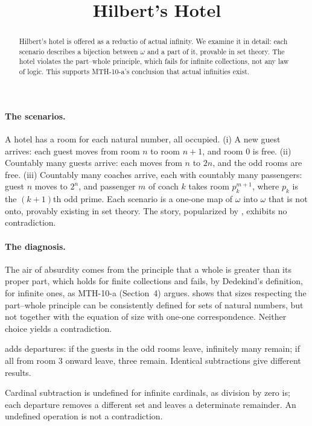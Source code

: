 \documentclass{situationist-preprint}
\title{Hilbert's Hotel}
\begin{document}
\maketitle

\begin{abstract}
Hilbert's hotel is offered as a reductio of actual infinity. We examine it in detail: each scenario describes a bijection between $\omega$ and a part of it, provable in set theory. The hotel violates the part--whole principle, which fails for infinite collections, not any law of logic. This supports MTH-10-a's conclusion that actual infinities exist.
\end{abstract}

\paragraph{The scenarios.} A hotel has a room for each natural number, all occupied. (i) A new guest arrives: each guest moves from room $n$ to room $n+1$, and room $0$ is free. (ii) Countably many guests arrive: each moves from $n$ to $2n$, and the odd rooms are free. (iii) Countably many coaches arrive, each with countably many passengers: guest $n$ moves to $2^{n}$, and passenger $m$ of coach $k$ takes room $p_k^{m+1}$, where $p_k$ is the $(k+1)$th odd prime. Each scenario is a one-one map of $\omega$ into $\omega$ that is not onto, provably existing in set theory. The story, popularized by \citet{Gamow1947}, exhibits no contradiction.

\paragraph{The diagnosis.} The air of absurdity comes from the principle that a whole is greater than its proper part, which holds for finite collections and fails, by Dedekind's definition, for infinite ones, as MTH-10-a (Section~4) argues. \citet{Mancosu2009} shows that sizes respecting the part--whole principle can be consistently defined for sets of natural numbers, but not together with the equation of size with one-one correspondence. Neither choice yields a contradiction.

\begin{objection}
\citet{Craig1979} adds departures: if the guests in the odd rooms leave, infinitely many remain; if all from room $3$ onward leave, three remain. Identical subtractions give different results.
\end{objection}

\begin{reply}
Cardinal subtraction is undefined for infinite cardinals, as division by zero is; each departure removes a different set and leaves a determinate remainder. An undefined operation is not a contradiction.
\end{reply}
\end{document}
